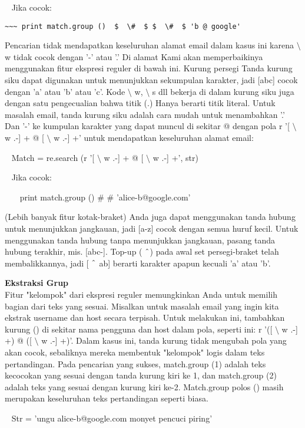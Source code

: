 \begin{enumerate}
\begin{enumerate}
~ Jika cocok:

\verb|~~~ print match.group ()  $  \#  $ $  \#  $ 'b @ google'|

Pencarian tidak mendapatkan keseluruhan alamat email dalam kasus ini karena  $  \setminus  $ w tidak cocok dengan '-' atau '.' Di alamat Kami akan memperbaikinya menggunakan fitur ekspresi reguler di bawah ini. Kurung persegi Tanda kurung siku dapat digunakan untuk menunjukkan sekumpulan karakter, jadi [abc] cocok dengan 'a' atau 'b' atau 'c'. Kode  $  \setminus  $ w,  $  \setminus  $ s dll bekerja di dalam kurung siku juga dengan satu pengecualian bahwa titik (.) Hanya berarti titik literal. Untuk masalah email, tanda kurung siku adalah cara mudah untuk menambahkan '.' Dan '-' ke kumpulan karakter yang dapat muncul di sekitar @ dengan pola r '[ $  \setminus  $ w .-] + @ [ $  \setminus  $ w .-] +' untuk mendapatkan keseluruhan alamat email:

~ Match = re.search (r '[ $  \setminus  $ w .-] + @ [ $  \setminus  $ w .-] +', str)

~ Jika cocok:

~~~ print match.group ()  $  \#  $ $  \#  $ 'alice-b@google.com'

(Lebih banyak fitur kotak-braket) Anda juga dapat menggunakan tanda hubung untuk menunjukkan jangkauan, jadi [a-z] cocok dengan semua huruf kecil. Untuk menggunakan tanda hubung tanpa menunjukkan jangkauan, pasang tanda hubung terakhir, mis. [abc-]. Top-up ( $  \string^  $) pada awal set persegi-braket telah membalikkannya, jadi [ $  \string^  $ ab] berarti karakter apapun kecuali 'a' atau 'b'.

{\fontsize{14pt}{14pt}\selectfont \textbf{Ekstraksi Grup} \\}
Fitur "kelompok" dari ekspresi reguler memungkinkan Anda untuk memilih bagian dari teks yang sesuai. Misalkan untuk masalah email yang ingin kita ekstrak username dan host secara terpisah. Untuk melakukan ini, tambahkan kurung () di sekitar nama pengguna dan host dalam pola, seperti ini: r '([ $  \setminus  $ w .-] +) @ ([ $  \setminus  $ w .-] +)'. Dalam kasus ini, tanda kurung tidak mengubah pola yang akan cocok, sebaliknya mereka membentuk "kelompok" logis dalam teks pertandingan. Pada pencarian yang sukses, match.group (1) adalah teks kecocokan yang sesuai dengan tanda kurung kiri ke 1, dan match.group (2) adalah teks yang sesuai dengan kurung kiri ke-2. Match.group polos () masih merupakan keseluruhan teks pertandingan seperti biasa.

~ Str = 'ungu alice-b@google.com monyet pencuci piring'


\end{enumerate}
\end{enumerate}
